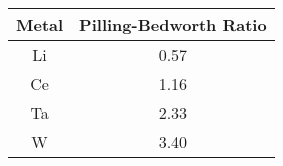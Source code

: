 \begin{tabular}{|c|c|}
    \hline
    Metal & Pilling-Bedworth Ratio \\
    \hline
    Li & 0.57 \\
    Ce & 1.16 \\
    Ta & 2.33 \\
    W & 3.40 \\
    \hline
    \end{tabular}